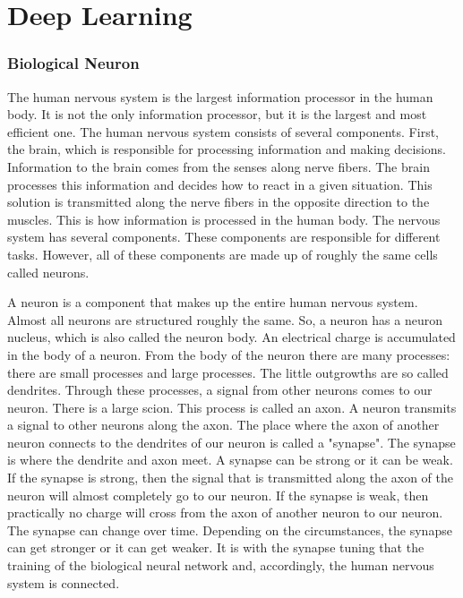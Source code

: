\chapter{Deep Learning}
\label{ch:deep_learning}

\subsection{Biological Neuron}
The human nervous system is the largest information processor in the human body. It is not the only information processor, but it is the largest and most efficient one. The human nervous system consists of several components. First, the brain, which is responsible for processing information and making decisions. Information to the brain comes from the senses along nerve fibers. The brain processes this information and decides how to react in a given situation. This solution is transmitted along the nerve fibers in the opposite direction to the muscles. This is how information is processed in the human body. The nervous system has several components. These components are responsible for different tasks. However, all of these components are made up of roughly the same cells called neurons.

A neuron is a component that makes up the entire human nervous system. Almost all neurons are structured roughly the same. 
So, a neuron has a neuron nucleus, which is also called the neuron body. An electrical charge is accumulated in the body of a neuron. From the body of the neuron there are many processes: there are small processes and large processes. The little outgrowths are so called dendrites. Through these processes, a signal from other neurons comes to our neuron. There is a large scion. This process is called an axon. A neuron transmits a signal to other neurons along the axon. The place where the axon of another neuron connects to the dendrites of our neuron is called a "synapse". The synapse is where the dendrite and axon meet. A synapse can be strong or it can be weak. If the synapse is strong, then the signal that is transmitted along the axon of the neuron will almost completely go to our neuron. If the synapse is weak, then practically no charge will cross from the axon of another neuron to our neuron. The synapse can change over time. Depending on the circumstances, the synapse can get stronger or it can get weaker. It is with the synapse tuning that the training of the biological neural network and, accordingly, the human nervous system is connected.

